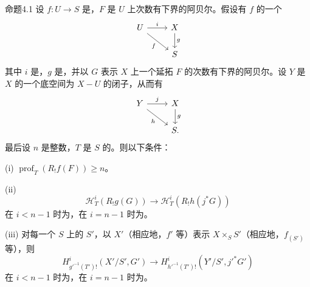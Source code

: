 \begin{SGAresult}{命题}{4.1}
设 $f:U\to S$ 是，$F$ 是 $U$ 上次数有下界的阿贝尔。假设有 $f$ 的一个
\[
\begin{tikzcd}
U\arrow[r,"i"]\arrow[dr,"f"']&X\arrow[d,"g"]\\
&S
\end{tikzcd}
\]
其中 $i$ 是，$g$ 是，并以 $G$ 表示 $X$ 上一个延拓 $F$ 的次数有下界的阿贝尔。设 $Y$ 是 $X$ 的一个底空间为 $X-U$ 的闭子，从而有
\[
\begin{tikzcd}
Y\arrow[r,"j"]\arrow[dr,"h"']&X\arrow[d,"g"]\\
&S.
\end{tikzcd}
\]
最后设 $n$ 是整数，$T$ 是 $S$ 的。则以下条件：

(i) $\operatorname{prof}_T(R_!f(F))\geq n$。

(ii) 
\[
\mathcal H^i_T(R_!g(G))\longrightarrow\mathcal H^i_T(R_!h(j^*G))
\]
在 $i<n-1$ 时为，在 $i=n-1$ 时为。

(iii) 对每一个 $S$ 上的 $S'$，以 $X'$（相应地，$f'$ 等）表示 $X\times_SS'$（相应地，$f_{(S')}$ 等），则
\[
H^i_{g'^{-1}(T')!}(X'/S',G')\longrightarrow
H^i_{h'^{-1}(T')!}(Y'/S',j'^*G')
\]
在 $i<n-1$ 时为，在 $i=n-1$ 时为。
\end{SGAresult}
